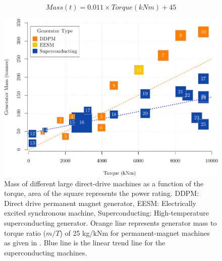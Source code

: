 \documentclass[12pt]{iopart}
\begin{document}
 \begin{equation}
     Mass(t)=0.011\times Torque(kNm)+45
     \label{mass_torque_eq}
 \end{equation}

\begin{figure}[]
\centering
\includegraphics[]{generator_mass_compare}
\caption{Mass of different large direct-drive machines as a function of the torque, area of the square represents the power rating.
 DDPM: Direct drive permanent magnet generator, EESM: Electrically excited synchronous machine, Superconducting: High-temperature superconducting generator. Orange line represents generator mass to torque ratio ($m/T$) of 25 kg/kNm for permanent-magnet machines as given in \cite{Bang2008}. Blue line is the linear trend line for the superconducting machines.}
\label{generators_mass_comparison}
\end{figure}
\end{document}
